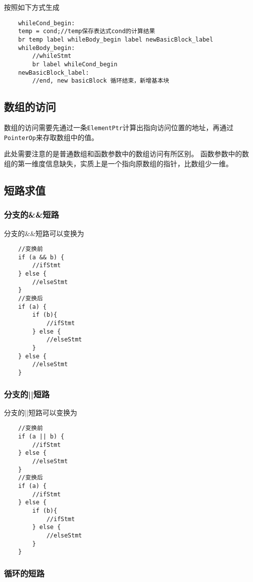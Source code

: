 按照如下方式生成

\begin{verbatim}
    whileCond_begin:
    temp = cond;//temp保存表达式cond的计算结果
    br temp label whileBody_begin label newBasicBlock_label
    whileBody_begin:
        //whileStmt
        br label whileCond_begin
    newBasicBlock_label:
        //end, new basicBlock 循环结束，新增基本块
\end{verbatim}

\subsection{数组的访问}
数组的访问需要先通过一条\texttt{ElementPtr}计算出指向访问位置的地址，再通过\texttt{PointerOp}来存取数组中的值。

此处需要注意的是普通数组和函数参数中的数组访问有所区别。
函数参数中的数组的第一维度信息缺失，实质上是一个指向原数组的指针，比数组少一维。

\subsection{短路求值}

\subsubsection{分支的\&\&短路}
分支的\&\&短路可以变换为
\begin{verbatim}
    //变换前
    if (a && b) {
        //ifStmt
    } else {
        //elseStmt
    }
    //变换后
    if (a) {
        if (b){
            //ifStmt
        } else {
            //elseStmt
        }
    } else {
        //elseStmt
    }

\end{verbatim}


\subsubsection{分支的||短路}

分支的||短路可以变换为
\begin{verbatim}
    //变换前
    if (a || b) {
        //ifStmt
    } else {
        //elseStmt
    }
    //变换后
    if (a) {
        //ifStmt
    } else {
        if (b){
            //ifStmt
        } else {
            //elseStmt
        }
    }

\end{verbatim}


\subsubsection{循环的短路}

